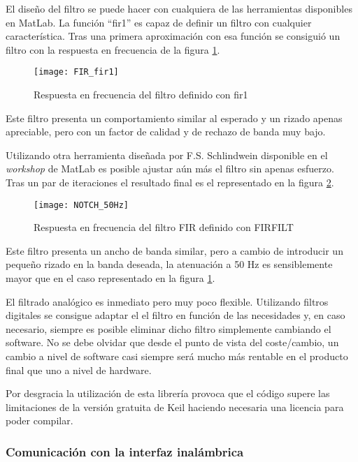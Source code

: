 El diseño del filtro se puede hacer con cualquiera de las herramientas disponibles en MatLab. La función ``fir1'' es capaz de definir un filtro con cualquier característica. Tras una primera aproximación con esa función se consiguió un filtro con la respuesta en frecuencia de la figura \ref{fig:FIR_fir1}.
\begin{figure} [H]
    \centering
    \texttt{[image: FIR\_fir1]}
    \caption{Respuesta en frecuencia del filtro definido con fir1}
    \label{fig:FIR_fir1}
\end{figure}

Este filtro presenta un comportamiento similar al esperado y un rizado apenas apreciable, pero con un factor de calidad y de rechazo de banda muy bajo. 

Utilizando otra herramienta diseñada por F.S. Schlindwein disponible en el \textit{workshop} de MatLab es posible ajustar aún más el filtro sin apenas esfuerzo. \\
Tras un par de iteraciones el resultado final es el representado en la figura \ref{fig:NOTCH_50Hz}.

\begin{figure} [H]
    \centering
    \texttt{[image: NOTCH\_50Hz]}
    \caption{Respuesta en frecuencia del filtro FIR definido con FIRFILT \cite{FIRFILT}}
    \label{fig:NOTCH_50Hz}
\end{figure}

Este filtro presenta un ancho de banda similar, pero a cambio de introducir un pequeño rizado en la banda deseada, la atenuación a 50 Hz es sensiblemente mayor que en el caso representado en la figura \ref{fig:FIR_fir1}.

El filtrado analógico es inmediato pero muy poco flexible. Utilizando filtros digitales se consigue adaptar el el filtro en función de las necesidades y, en caso necesario, siempre es posible eliminar dicho filtro simplemente cambiando el software. No se debe olvidar que desde el punto de vista del coste/cambio, un cambio a nivel de software casi siempre será mucho más rentable en el producto final que uno a nivel de hardware.

Por desgracia la utilización de esta librería provoca que el código supere las limitaciones de la versión gratuita de Keil haciendo necesaria una licencia para poder compilar.

\clearpage

\subsubsection{Comunicación con la interfaz inalámbrica\label{sec:Software_micro_ESP}}

